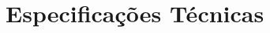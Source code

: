 \documentclass[a4paper, 10pt]{article}
\begin{document}
%
%
\section{Especificações Técnicas}
\end{document}
